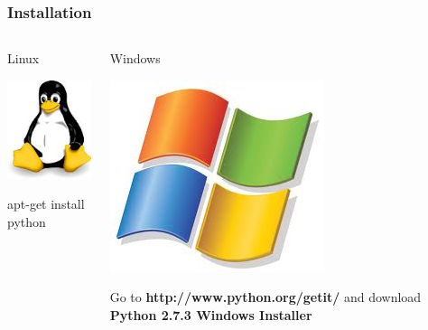 \documentclass[colorlinks]{beamer}
\begin{document}
\begin{frame}[fragile]\frametitle{Installation}

  \begin{columns}[T]
    \begin{column}{.4\textwidth}
        \begin{block}{\centering Linux}
\begin{center}
    \includegraphics[scale=0.3]{figs/linux.jpg}
\end{center}
                  apt-get install python
        \end{block}
    \end{column}
    \begin{column}{.6\textwidth}
        \begin{block}{ \centering  Windows}
\centering

\begin{center}
\includegraphics[scale=0.3]{figs/windows.jpg}
\end{center}    
            Go to \textbf{http://www.python.org/getit/}
            and download 
\textbf{Python 2.7.3 Windows Installer}
        \end{block}        
    \end{column}
  \end{columns}
\end{frame}
\end{document}
